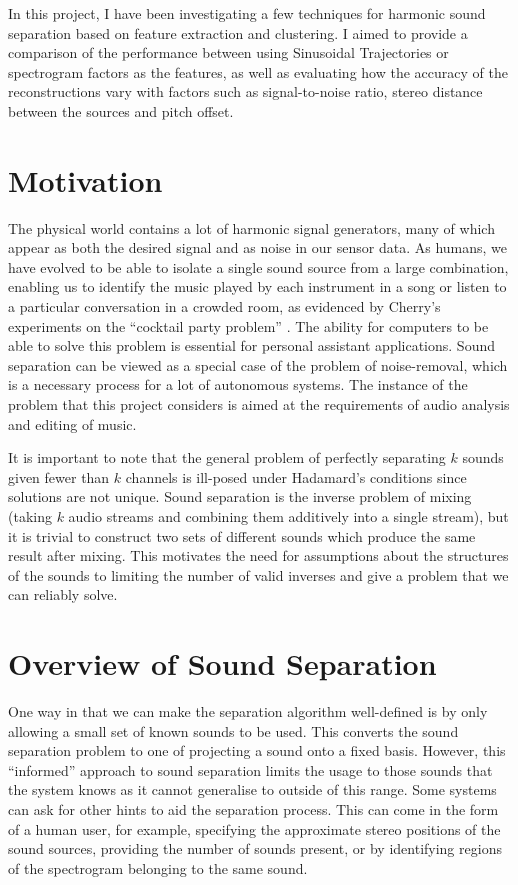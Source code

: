 \documentclass[10pt,twoside,a4paper]{report}
\begin{document}

In this project, I have been investigating a few techniques for harmonic sound separation based on feature extraction and clustering. I aimed to provide a comparison of the performance between using Sinusoidal Trajectories or spectrogram factors as the features, as well as evaluating how the accuracy of the reconstructions vary with factors such as signal-to-noise ratio, stereo distance between the sources and pitch offset.

\section{Motivation}

The physical world contains a lot of harmonic signal generators, many of which appear as both the desired signal and as noise in our sensor data. As humans, we have evolved to be able to isolate a single sound source from a large combination, enabling us to identify the music played by each instrument in a song or listen to a particular conversation in a crowded room, as evidenced by Cherry's experiments on the ``cocktail party problem'' \cite{cherry1953some}. The ability for computers to be able to solve this problem is essential for personal assistant applications. Sound separation can be viewed as a special case of the problem of noise-removal, which is a necessary process for a lot of autonomous systems. The instance of the problem that this project considers is aimed at the requirements of audio analysis and editing of music.

It is important to note that the general problem of perfectly separating $ k $ sounds given fewer than $ k $ channels is ill-posed under Hadamard's conditions \cite{hadamard1902problemes} since solutions are not unique. Sound separation is the inverse problem of mixing (taking $ k $ audio streams and combining them additively into a single stream), but it is trivial to construct two sets of different sounds which produce the same result after mixing. This motivates the need for assumptions about the structures of the sounds to limiting the number of valid inverses and give a problem that we can reliably solve.

\section{Overview of Sound Separation}

One way in that we can make the separation algorithm well-defined is by only allowing a small set of known sounds to be used. This converts the sound separation problem to one of projecting a sound onto a fixed basis. However, this ``informed'' approach to sound separation limits the usage to those sounds that the system knows as it cannot generalise to outside of this range. Some systems can ask for other hints to aid the separation process. This can come in the form of a human user, for example, specifying the approximate stereo positions of the sound sources, providing the number of sounds present, or by identifying regions of the spectrogram belonging to the same sound.
\end{document}
